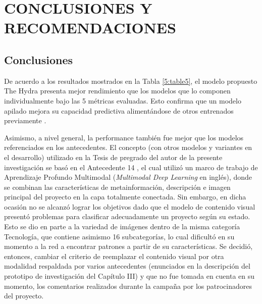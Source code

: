 \chapter{CONCLUSIONES Y RECOMENDACIONES}
\section{Conclusiones}
De acuerdo a los resultados mostrados en la Tabla \ref{5:table5}, el modelo propuesto The Hydra presenta mejor rendimiento que los modelos que lo componen individualmente bajo las 5 métricas evaluadas. Esto confirma que un modelo apilado mejora su capacidad predictiva alimentándose de otros entrenados previamente \parencite{tec_brownlee2018stacked_models}.

Asimismo, a nivel general, la performance también fue mejor que los modelos referenciados en los antecedentes. El concepto (con otros modelos y variantes en el desarrollo) utilizado en la Tesis de pregrado del autor de la presente investigación \parencite{pr_puente2019kickstarter_prediction} se basó en el Antecedente 14 \parencite{pr_cheng2019deeplearning}, el cual utilizó un marco de trabajo de Aprendizaje Profundo Multimodal (\textit{Multimodal Deep Learning} en inglés), donde se combinan las características de metainformación, descripción e imagen principal del proyecto en la capa totalmente conectada. Sin embargo, en dicha ocasión no se alcanzó lograr los objetivos dado que el modelo de contenido visual presentó problemas para clasificar adecuadamente un proyecto según su estado. Esto se dio en parte a la variedad de imágenes dentro de la misma categoría Tecnología, que contiene asimismo 16 subcategorías, lo cual dificultó en su momento a la red a encontrar patrones a partir de su características. Se decidió, entonces, cambiar el criterio de reemplazar el contenido visual por otra modalidad respaldada por varios antecedentes (enunciados en la descripción del prototipo de investigación del Capítulo III) y que no fue tomada en cuenta en su momento, los comentarios realizados durante la campaña por los patrocinadores del proyecto.

